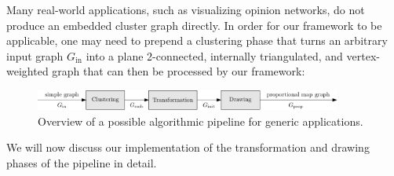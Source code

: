 Many real-world applications, such as visualizing opinion networks, do not produce an embedded cluster graph directly.
In order for our framework to be applicable, one may need to prepend a clustering phase that turns an arbitrary input graph $G_\text{in}$ into a plane 2-connected, internally triangulated, and vertex-weighted graph that can then be processed by our framework:
%
\begin{figure}[H]
	\centering\includegraphics[width=0.9\textwidth]{Resources/Pipeline-Application-Static.pdf}
	\caption{Overview of a possible algorithmic pipeline for generic applications.}
	\label{fig:static-pipeline-application}
\end{figure}

We will now discuss our implementation of the transformation and drawing phases of the pipeline in detail.

\clearpage


\clearpage

